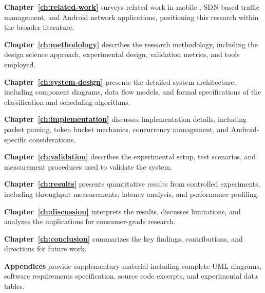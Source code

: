 \textbf{Chapter~\ref{ch:related-work}} surveys related work in mobile \qos, SDN-based traffic management, and Android network applications, positioning this research within the broader literature.

\textbf{Chapter~\ref{ch:methodology}} describes the research methodology, including the design science approach, experimental design, validation metrics, and tools employed.

\textbf{Chapter~\ref{ch:system-design}} presents the detailed system architecture, including component diagrams, data flow models, and formal specifications of the classification and scheduling algorithms.

\textbf{Chapter~\ref{ch:implementation}} discusses implementation details, including packet parsing, token bucket mechanics, concurrency management, and Android-specific considerations.

\textbf{Chapter~\ref{ch:validation}} describes the experimental setup, test scenarios, and measurement procedures used to validate the system.

\textbf{Chapter~\ref{ch:results}} presents quantitative results from controlled experiments, including throughput measurements, latency analysis, and performance profiling.

\textbf{Chapter~\ref{ch:discussion}} interprets the results, discusses limitations, and analyzes the implications for consumer-grade \qos research.

\textbf{Chapter~\ref{ch:conclusion}} summarizes the key findings, contributions, and directions for future work.

\textbf{Appendices} provide supplementary material including complete UML diagrams, software requirements specification, source code excerpts, and experimental data tables.
